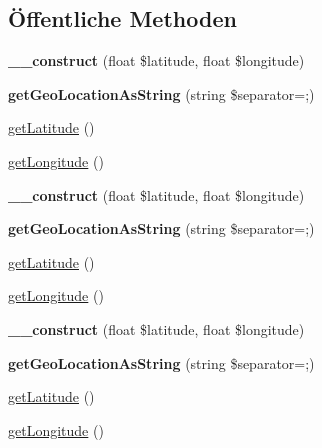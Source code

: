 \subsection*{Öffentliche Methoden}
\begin{DoxyCompactItemize}
\item 
\mbox{\label{class_eluceo_1_1i_cal_1_1_property_1_1_event_1_1_geo_a5654bdf85fcb0e17ad56e11707d72ce9}} 
{\bfseries \+\_\+\+\_\+construct} (float \$latitude, float \$longitude)
\item 
\mbox{\label{class_eluceo_1_1i_cal_1_1_property_1_1_event_1_1_geo_a2c360f8c5e3b6d44faa3e947e0d5af76}} 
{\bfseries get\+Geo\+Location\+As\+String} (string \$separator=\textquotesingle{};\textquotesingle{})
\item 
\mbox{\hyperlink{class_eluceo_1_1i_cal_1_1_property_1_1_event_1_1_geo_a72280c9f83b6c60a67f4bc130dbc2c04}{get\+Latitude}} ()
\item 
\mbox{\hyperlink{class_eluceo_1_1i_cal_1_1_property_1_1_event_1_1_geo_ade59098963ef1feaa793994efbf8e521}{get\+Longitude}} ()
\item 
\mbox{\label{class_eluceo_1_1i_cal_1_1_property_1_1_event_1_1_geo_a5654bdf85fcb0e17ad56e11707d72ce9}} 
{\bfseries \+\_\+\+\_\+construct} (float \$latitude, float \$longitude)
\item 
\mbox{\label{class_eluceo_1_1i_cal_1_1_property_1_1_event_1_1_geo_a2c360f8c5e3b6d44faa3e947e0d5af76}} 
{\bfseries get\+Geo\+Location\+As\+String} (string \$separator=\textquotesingle{};\textquotesingle{})
\item 
\mbox{\hyperlink{class_eluceo_1_1i_cal_1_1_property_1_1_event_1_1_geo_a72280c9f83b6c60a67f4bc130dbc2c04}{get\+Latitude}} ()
\item 
\mbox{\hyperlink{class_eluceo_1_1i_cal_1_1_property_1_1_event_1_1_geo_ade59098963ef1feaa793994efbf8e521}{get\+Longitude}} ()
\item 
\mbox{\label{class_eluceo_1_1i_cal_1_1_property_1_1_event_1_1_geo_a5654bdf85fcb0e17ad56e11707d72ce9}} 
{\bfseries \+\_\+\+\_\+construct} (float \$latitude, float \$longitude)
\item 
\mbox{\label{class_eluceo_1_1i_cal_1_1_property_1_1_event_1_1_geo_a2c360f8c5e3b6d44faa3e947e0d5af76}} 
{\bfseries get\+Geo\+Location\+As\+String} (string \$separator=\textquotesingle{};\textquotesingle{})
\item 
\mbox{\hyperlink{class_eluceo_1_1i_cal_1_1_property_1_1_event_1_1_geo_a72280c9f83b6c60a67f4bc130dbc2c04}{get\+Latitude}} ()
\item 
\mbox{\hyperlink{class_eluceo_1_1i_cal_1_1_property_1_1_event_1_1_geo_ade59098963ef1feaa793994efbf8e521}{get\+Longitude}} ()
\end{DoxyCompactItemize}
